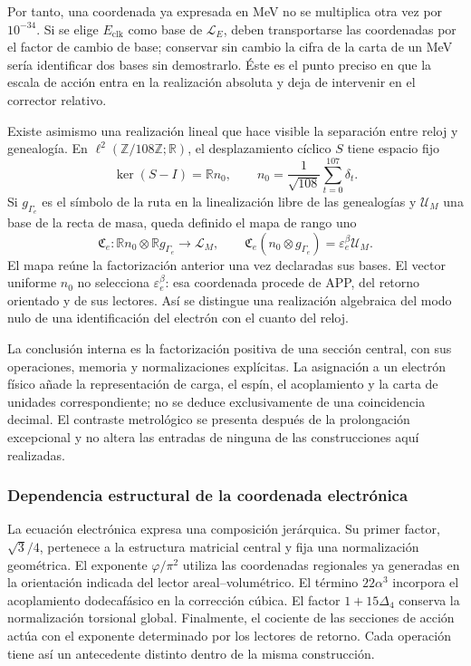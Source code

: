 Por tanto, una coordenada ya expresada en MeV no se multiplica otra vez
por \(10^{-34}\). Si se elige \(E_{\mathrm{clk}}\) como base de
\(\mathcal L_E\), deben transportarse las coordenadas por el factor
de cambio de base; conservar sin cambio la cifra de la carta de un MeV
sería identificar dos bases sin demostrarlo. Éste es el punto preciso
en que la escala de acción entra en la realización absoluta y deja de
intervenir en el corrector relativo.

Existe asimismo una realización lineal que hace visible la separación
entre reloj y genealogía. En
\(\ell^2(\mathbb Z/108\mathbb Z;\mathbb R)\), el desplazamiento
cíclico \(S\) tiene espacio fijo
\[
 \ker(S-I)=\mathbb R n_0,\qquad
 n_0=\frac1{\sqrt{108}}\sum_{t=0}^{107}\delta_t.
\]
Si \(g_{\Gamma_e}\) es el símbolo de la ruta en la linealización libre
de las genealogías y \(\mathcal U_M\) una base de la recta de masa,
queda definido el mapa de rango uno
\begin{equation}
 \mathfrak C_e:
 \mathbb R n_0\otimes\mathbb R g_{\Gamma_e}\longrightarrow\mathcal L_M,
 \qquad
 \mathfrak C_e(n_0\otimes g_{\Gamma_e})
 =\varepsilon_e^\beta\mathcal U_M.
 \label{x_reciprocidad:eq:el-rango-uno}
\end{equation}
El mapa reúne la factorización anterior una vez declaradas sus bases.
El vector uniforme \(n_0\) no selecciona \(\varepsilon_e^\beta\):
esa coordenada procede de APP, del retorno orientado y de sus lectores.
Así se distingue una realización algebraica del modo nulo de una
identificación del electrón con el cuanto del reloj.

La conclusión interna es la factorización positiva de una sección
central, con sus operaciones, memoria y normalizaciones explícitas. La
asignación a un electrón físico añade la representación de carga, el
espín, el acoplamiento y la carta de unidades correspondiente; no se
deduce exclusivamente de una coincidencia decimal. El contraste
metrológico se presenta después de la prolongación excepcional y no altera
las entradas de ninguna de las construcciones aquí realizadas.


\subsubsection{Dependencia estructural de la coordenada electrónica}

La ecuación electrónica expresa una composición jerárquica. Su primer
factor, \(\sqrt3/4\), pertenece a la estructura matricial central y fija
una normalización geométrica. El exponente \(\varphi/\pi^2\) utiliza las
coordenadas regionales ya generadas en la orientación indicada del lector
areal--volumétrico. El término \(22\alpha^3\) incorpora el acoplamiento
dodecafásico en la corrección cúbica. El factor \(1+15\Delta_4\) conserva
la normalización torsional global. Finalmente, el cociente de las secciones
de acción actúa con el exponente determinado por los lectores de retorno.
Cada operación tiene así un antecedente distinto dentro de la misma
construcción.

